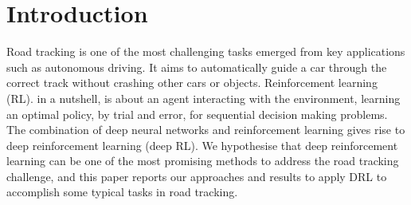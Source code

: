\documentclass{svproc}
\begin{document}
	\section{Introduction}
	Road tracking is one of the most challenging tasks emerged from key applications such as autonomous driving. It aims to automatically guide a car through the correct track without crashing other cars or objects.  
	Reinforcement learning (RL). in a nutshell, is about an agent interacting with the environment, learning an optimal policy, by trial and error, for sequential decision making problems.
	The combination of deep neural networks and reinforcement learning gives rise to deep reinforcement learning (deep RL). We hypothesise that deep reinforcement learning %
	can be one of the most promising %
	methods %
	to address 
	the road tracking challenge, and this paper %
	reports our approaches and results to apply DRL to accomplish some typical tasks in road tracking. 
	
\end{document}
